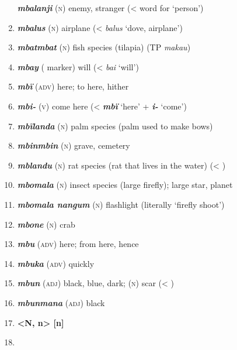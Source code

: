 \begin{enumerate}[noitemsep, label={}, align=left, widest=190, labelsep=1ex,leftmargin=*,itemindent=-10pt]
\textbf{\textit{mbalanji}} (\textsc{n}) enemy, stranger (<  word for ‘person’) \item 
\textbf{\textit{mbalus}} (\textsc{n}) airplane (<  \textit{balus} ‘dove, airplane’) \item 
\textbf{\textit{mbatmbat}} (\textsc{n}) fish species (tilapia) (TP \textit{makau}) \item 
\textbf{\textit{mbay}} ( marker) will (<  \textit{bai} ‘will’) \item 
\textbf{\textit{mbï}} (\textsc{adv)} here; to here, hither \item 
\textbf{\textit{mbi-}} (\textsc{v}) come here (< \textbf{\textit{mbï}} ‘here’ + \textbf{\textit{i-}} ‘come’) \item 
\textbf{\textit{mbïlanda}} (\textsc{n}) palm species (palm used to make bows) \item 
\textbf{\textit{mbinmbin}} (\textsc{n}) grave, cemetery \item 
\textbf{\textit{mblandu}} (\textsc{n}) rat species (rat that lives in the water) (< ) \item 
\textbf{\textit{mbomala}} (\textsc{n}) insect species (large firefly); large star, planet \item 
\textbf{\textit{mbomala nangum}} (\textsc{n}) flashlight (literally ‘firefly shoot’) \item 
\textbf{\textit{mbone}} (\textsc{n}) crab \item 
\textbf{\textit{mbu}} (\textsc{adv)} here; from here, hence \item 
\textbf{\textit{mbuka}} (\textsc{adv}) quickly \item 
\textbf{\textit{mbun}} (\textsc{adj}) black, blue, dark; (\textsc{n}) scar (< ) \item 
\textbf{\textit{mbunmana}} (\textsc{adj}) black\\ \item 

\newpage

\noindent \textbf{<N, n>        [n]}\\ \item 


\end{enumerate}
